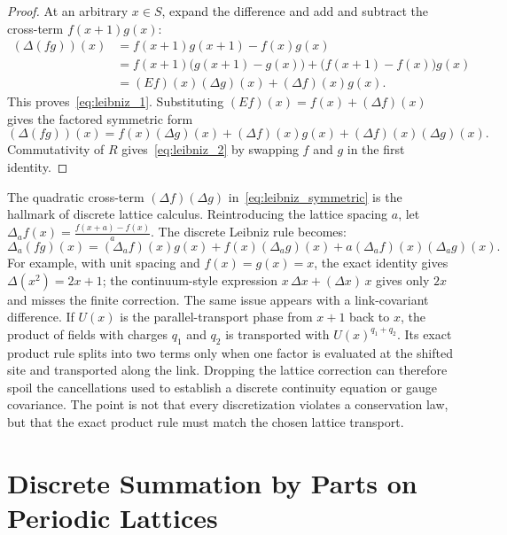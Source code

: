 \begin{proof}
At an arbitrary $x\in S$, expand the difference and add and subtract the cross-term $f(x+1)g(x)$:
\begin{align}
(\Delta(fg))(x)
&=f(x+1)g(x+1)-f(x)g(x) \\
&=f(x+1)\bigl(g(x+1)-g(x)\bigr)+\bigl(f(x+1)-f(x)\bigr)g(x) \\
&=(Ef)(x)(\Delta g)(x)+(\Delta f)(x)g(x).
\end{align}
This proves~\eqref{eq:leibniz_1}. Substituting $(Ef)(x)=f(x)+(\Delta f)(x)$ gives the factored symmetric form
\begin{equation}
(\Delta(fg))(x)=f(x)(\Delta g)(x)+(\Delta f)(x)g(x)+(\Delta f)(x)(\Delta g)(x).
\end{equation}
Commutativity of $R$ gives~\eqref{eq:leibniz_2} by swapping $f$ and $g$ in the first identity.
\end{proof}

\begin{remark}
The quadratic cross-term $(\Delta f)(\Delta g)$ in~\eqref{eq:leibniz_symmetric} is the hallmark of discrete lattice calculus. Reintroducing the lattice spacing $a$, let $\Delta_a f(x) = \frac{f(x+a) - f(x)}{a}$. The discrete Leibniz rule becomes:
\begin{equation}
\Delta_a(f g)(x) = (\Delta_a f)(x) g(x) + f(x) (\Delta_a g)(x) + a (\Delta_a f)(x) (\Delta_a g)(x).
\end{equation}
For example, with unit spacing and $f(x)=g(x)=x$, the exact identity gives
$\Delta(x^2)=2x+1$; the continuum-style expression
$x\,\Delta x+(\Delta x)\,x$ gives only $2x$ and misses the finite correction.
The same issue appears with a link-covariant difference. If $U(x)$ is the
parallel-transport phase from $x+1$ back to $x$, the product of fields with
charges $q_1$ and $q_2$ is transported with $U(x)^{q_1+q_2}$. Its exact
product rule splits into two terms only when one factor is evaluated at the
shifted site and transported along the link. Dropping the lattice correction
can therefore spoil the cancellations used to establish a discrete continuity
equation or gauge covariance. The point is not that every discretization
violates a conservation law, but that the exact product rule must match the
chosen lattice transport.
\end{remark}

\section{Discrete Summation by Parts on Periodic Lattices}

